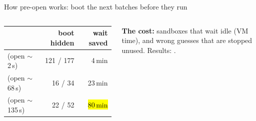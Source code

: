 \begin{frame}{How pre-open works: boot the next batches before they run}
\begin{columns}[T]
\tiny\setlength{\tabcolsep}{3pt}
\begin{tabular}{@{}lrr@{}}
\toprule
& \textbf{boot hidden} & \textbf{wait saved}\\
\midrule
\smv{} (open $\sim$2\,s) & 121 / 177 & 4\,min\\
\sm{} (open $\sim$68\,s) & 16 / 34 & 23\,min\\
\sg{} (open $\sim$135\,s) & 22 / 52 & \hl{80\,min}\\
\bottomrule
\end{tabular}
\par\vspace{1mm}
{\tiny\textbf{The cost:} sandboxes that wait idle (VM time), and wrong guesses that are stopped unused. Results: .\par}
\end{columns}
\end{frame}

